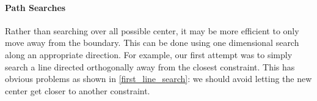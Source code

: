 \paragraph{Path Searches}

% 
% 
% 
% 
% 

Rather than searching over all possible center, it may be more efficient to only move away from the boundary.
This can be done using one dimensional search along an appropriate direction.
For example, our first attempt was to simply search a line directed orthogonally away from the closest constraint.
This has obvious problems as shown in \cref{first_line_search}: we should avoid letting the new center get closer to another constraint.    


